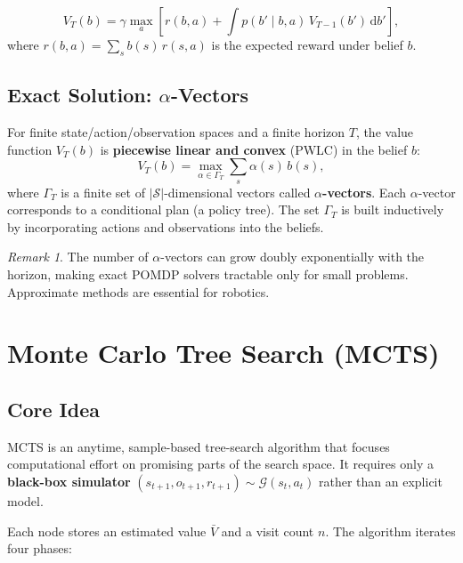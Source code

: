 \documentclass[11pt,a4paper]{article}
\theoremstyle{definition}
\theoremstyle{plain}
\theoremstyle{remark}
\newtheorem*{remark}{Remark}
\begin{document}
\begin{tcolorbox}[colback=blue!5!white,colframe=blue!75!black,title=\textbf{POMDP Bellman Equation}]
\[
    V_T(b) = \gamma\max_a\!\left[r(b, a) + \int p(b' \mid b, a)\, V_{T-1}(b')\,\mathrm{d}b'\right],
\]
where $r(b, a) = \sum_s b(s)\, r(s, a)$ is the expected reward under belief $b$.
\end{tcolorbox}

\subsection{Exact Solution: $\alpha$-Vectors}

For finite state/action/observation spaces and a finite horizon $T$, the value function $V_T(b)$ is \textbf{piecewise linear and convex} (PWLC) in the belief $b$:
\[
    V_T(b) = \max_{\alpha \in \Gamma_T} \sum_s \alpha(s)\, b(s),
\]
where $\Gamma_T$ is a finite set of $|\mathcal{S}|$-dimensional vectors called \textbf{$\alpha$-vectors}. Each $\alpha$-vector corresponds to a conditional plan (a policy tree). The set $\Gamma_T$ is built inductively by incorporating actions and observations into the beliefs.

\begin{remark}
The number of $\alpha$-vectors can grow doubly exponentially with the horizon, making exact POMDP solvers tractable only for small problems. Approximate methods are essential for robotics.
\end{remark}

\section{Monte Carlo Tree Search (MCTS)}

\subsection{Core Idea}

MCTS is an anytime, sample-based tree-search algorithm that focuses computational effort on promising parts of the search space. It requires only a \textbf{black-box simulator} $(s_{t+1}, o_{t+1}, r_{t+1}) \sim \mathcal{G}(s_t, a_t)$ rather than an explicit model.

Each node stores an estimated value $\bar{V}$ and a visit count $n$. The algorithm iterates four phases:
\end{document}
